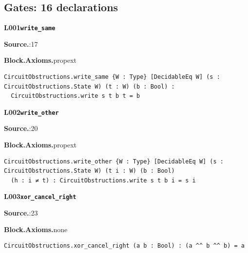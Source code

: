 \subsection*{Gates: 16 declarations}
\par\medskip\noindent\begin{minipage}{\textwidth}
{\small\bfseries L001\enspace\texttt{write\_same}\par}
{\footnotesize\raggedright\textbf{Source.}\enspace{}:17\par
\textbf{Block.}\quad\textbf{Axioms.}\enspace propext\par}\nopagebreak
\begin{lstlisting}
CircuitObstructions.write_same {W : Type} [DecidableEq W] (s : CircuitObstructions.State W) (t : W) (b : Bool) :
  CircuitObstructions.write s t b t = b
\end{lstlisting}
\end{minipage}\par

\par\medskip\noindent\begin{minipage}{\textwidth}
{\small\bfseries L002\enspace\texttt{write\_other}\par}
{\footnotesize\raggedright\textbf{Source.}\enspace{}:20\par
\textbf{Block.}\quad\textbf{Axioms.}\enspace propext\par}\nopagebreak
\begin{lstlisting}
CircuitObstructions.write_other {W : Type} [DecidableEq W] (s : CircuitObstructions.State W) (t i : W) (b : Bool)
  (h : i ≠ t) : CircuitObstructions.write s t b i = s i
\end{lstlisting}
\end{minipage}\par

\par\medskip\noindent\begin{minipage}{\textwidth}
{\small\bfseries L003\enspace\texttt{xor\_cancel\_right}\par}
{\footnotesize\raggedright\textbf{Source.}\enspace{}:23\par
\textbf{Block.}\quad\textbf{Axioms.}\enspace none\par}\nopagebreak
\begin{lstlisting}
CircuitObstructions.xor_cancel_right (a b : Bool) : (a ^^ b ^^ b) = a
\end{lstlisting}
\end{minipage}\par

